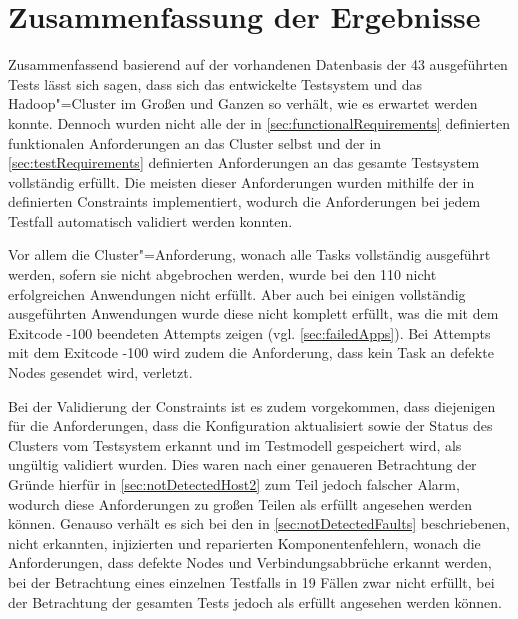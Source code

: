 \section{Zusammenfassung der Ergebnisse}
\label{sec:evaluationResults}

Zusammenfassend basierend auf der vorhandenen Datenbasis der 43 ausgeführten Tests lässt sich sagen, dass sich das entwickelte Testsystem und das Hadoop"=Cluster im Großen und Ganzen so verhält, wie es erwartet werden konnte.
Dennoch wurden nicht alle der in \autoref{sec:functionalRequirements} definierten funktionalen Anforderungen an das Cluster selbst und der in \autoref{sec:testRequirements} definierten Anforderungen an das gesamte Testsystem vollständig erfüllt.
Die meisten dieser Anforderungen wurden mithilfe der in  definierten Constraints implementiert, wodurch die Anforderungen bei jedem Testfall automatisch validiert werden konnten.

Vor allem die Cluster"=Anforderung, wonach alle Tasks vollständig ausgeführt werden, sofern sie nicht abgebrochen werden, wurde bei den 110 nicht erfolgreichen Anwendungen nicht erfüllt.
Aber auch bei einigen vollständig ausgeführten Anwendungen wurde diese nicht komplett erfüllt, was die mit dem Exitcode -100 beendeten Attempts zeigen (vgl. \autoref{sec:failedApps}).
Bei Attempts mit dem Exitcode -100 wird zudem die Anforderung, dass kein Task an defekte Nodes gesendet wird, verletzt.

Bei der Validierung der Constraints ist es zudem vorgekommen, dass diejenigen für die Anforderungen, dass die Konfiguration aktualisiert sowie der Status des Clusters vom Testsystem erkannt und im Testmodell gespeichert wird, als ungültig validiert wurden.
Dies waren nach einer genaueren Betrachtung der Gründe hierfür in \autoref{sec:notDetectedHost2} zum Teil jedoch falscher Alarm, wodurch diese Anforderungen zu großen Teilen als erfüllt angesehen werden können.
Genauso verhält es sich bei den in \autoref{sec:notDetectedFaults} beschriebenen, nicht erkannten, injizierten und reparierten Komponentenfehlern, wonach die Anforderungen, dass defekte Nodes und Verbindungsabbrüche erkannt werden, bei der Betrachtung eines einzelnen Testfalls in 19 Fällen zwar nicht erfüllt, bei der Betrachtung der gesamten Tests jedoch als erfüllt angesehen werden können.

